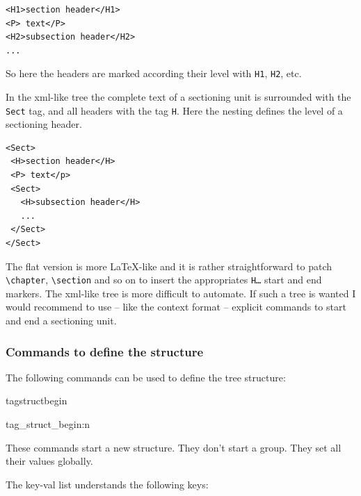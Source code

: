 \documentclass[DIV=12,parskip=half-,bibliography=totoc]{scrartcl}
\begin{document}
\begin{lstlisting}
<H1>section header</H1>
<P> text</P>
<H2>subsection header</H2>
...
\end{lstlisting}


So here the headers are marked according their level with \texttt{H1}, \texttt{H2}, etc.

In the xml-like tree the complete text of a sectioning unit is surrounded with the \texttt{Sect} tag, and all headers with the tag \texttt{H}. Here the nesting defines the level of a sectioning header.


\begin{lstlisting}
<Sect>
 <H>section header</H>
 <P> text</p>
 <Sect>
   <H>subsection header</H>
   ...
 </Sect>
</Sect>
\end{lstlisting}


The flat version is more \LaTeX-like and it is rather straightforward to patch \verb+\chapter+, \verb+\section+ and so on to insert the appropriates \texttt{H\ldots} start and end markers. The xml-like tree is more difficult to automate. If such a tree is wanted I would recommend to use -- like the context format -- explicit commands to start and end a sectioning unit.



\subsubsection{Commands to define the structure}


The following commands can be used to define the tree structure:


\begin{docCommand}{tagstructbegin}{}\end{docCommand}
\begin{docCommand}{tag_struct_begin:n}{}\end{docCommand}

These commands start a new structure. They don't start a group. They set all their values globally.

The key-val list understands the following keys:
\end{document}
